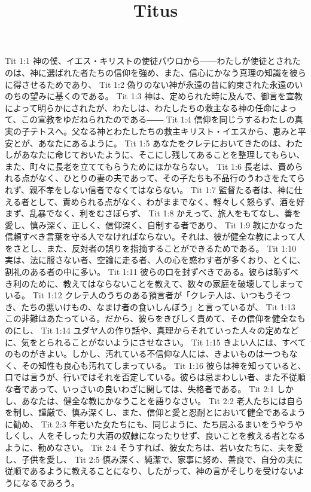 

\title{Titus}

Tit 1:1  神の僕、イエス・キリストの使徒パウロから――わたしが使徒とされたのは、神に選ばれた者たちの信仰を強め、また、信心にかなう真理の知識を彼らに得させるためであり、
Tit 1:2  偽りのない神が永遠の昔に約束された永遠のいのちの望みに基くのである。
Tit 1:3  神は、定められた時に及んで、御言を宣教によって明らかにされたが、わたしは、わたしたちの救主なる神の任命によって、この宣教をゆだねられたのである――
Tit 1:4  信仰を同じうするわたしの真実の子テトスへ。父なる神とわたしたちの救主キリスト・イエスから、恵みと平安とが、あなたにあるように。
Tit 1:5  あなたをクレテにおいてきたのは、わたしがあなたに命じておいたように、そこにし残してあることを整理してもらい、また、町々に長老を立ててもらうためにほかならない。
Tit 1:6  長老は、責められる点がなく、ひとりの妻の夫であって、その子たちも不品行のうわさをたてられず、親不孝をしない信者でなくてはならない。
Tit 1:7  監督たる者は、神に仕える者として、責められる点がなく、わがままでなく、軽々しく怒らず、酒を好まず、乱暴でなく、利をむさぼらず、
Tit 1:8  かえって、旅人をもてなし、善を愛し、慎み深く、正しく、信仰深く、自制する者であり、
Tit 1:9  教にかなった信頼すべき言葉を守る人でなければならない。それは、彼が健全な教によって人をさとし、また、反対者の誤りを指摘することができるためである。
Tit 1:10  実は、法に服さない者、空論に走る者、人の心を惑わす者が多くおり、とくに、割礼のある者の中に多い。
Tit 1:11  彼らの口を封ずべきである。彼らは恥ずべき利のために、教えてはならないことを教えて、数々の家庭を破壊してしまっている。
Tit 1:12  クレテ人のうちのある預言者が「クレテ人は、いつもうそつき、たちの悪いけもの、なまけ者の食いしんぼう」と言っているが、
Tit 1:13  この非難はあたっている。だから、彼らをきびしく責めて、その信仰を健全なものにし、
Tit 1:14  ユダヤ人の作り話や、真理からそれていった人々の定めなどに、気をとられることがないようにさせなさい。
Tit 1:15  きよい人には、すべてのものがきよい。しかし、汚れている不信仰な人には、きよいものは一つもなく、その知性も良心も汚れてしまっている。
Tit 1:16  彼らは神を知っていると、口では言うが、行いではそれを否定している。彼らは忌まわしい者、また不従順な者であって、いっさいの良いわざに関しては、失格者である。
Tit 2:1  しかし、あなたは、健全な教にかなうことを語りなさい。
Tit 2:2  老人たちには自らを制し、謹厳で、慎み深くし、また、信仰と愛と忍耐とにおいて健全であるように勧め、
Tit 2:3  年老いた女たちにも、同じように、たち居ふるまいをうやうやしくし、人をそしったり大酒の奴隷になったりせず、良いことを教える者となるように、勧めなさい。
Tit 2:4  そうすれば、彼女たちは、若い女たちに、夫を愛し、子供を愛し、
Tit 2:5  慎み深く、純潔で、家事に努め、善良で、自分の夫に従順であるように教えることになり、したがって、神の言がそしりを受けないようになるであろう。

